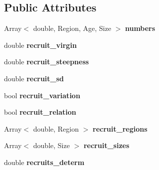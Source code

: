 \subsection*{Public Attributes}
\begin{DoxyCompactItemize}
\item 
\hypertarget{classIOSKJ_1_1Model_aa90edf75b7c9ebf8e50a30f3779b9664}{Array$<$ double, Region, Age, Size $>$ {\bfseries numbers}}\label{classIOSKJ_1_1Model_aa90edf75b7c9ebf8e50a30f3779b9664}

\item 
\hypertarget{classIOSKJ_1_1Model_a686cbcc0d80f740b223f1f25b0869da7}{double {\bfseries recruit\-\_\-virgin}}\label{classIOSKJ_1_1Model_a686cbcc0d80f740b223f1f25b0869da7}

\item 
\hypertarget{classIOSKJ_1_1Model_a862b4466389406b47613ad56ab137d8e}{double {\bfseries recruit\-\_\-steepness}}\label{classIOSKJ_1_1Model_a862b4466389406b47613ad56ab137d8e}

\item 
\hypertarget{classIOSKJ_1_1Model_a2efdcaae859b3c94a3a0c6cd885b4fc2}{double {\bfseries recruit\-\_\-sd}}\label{classIOSKJ_1_1Model_a2efdcaae859b3c94a3a0c6cd885b4fc2}

\item 
\hypertarget{classIOSKJ_1_1Model_a83f5db36b2616ea265b360872b5586e5}{bool {\bfseries recruit\-\_\-variation}}\label{classIOSKJ_1_1Model_a83f5db36b2616ea265b360872b5586e5}

\item 
\hypertarget{classIOSKJ_1_1Model_a758094db1a66fe7e6fb040e63169d50b}{bool {\bfseries recruit\-\_\-relation}}\label{classIOSKJ_1_1Model_a758094db1a66fe7e6fb040e63169d50b}

\item 
\hypertarget{classIOSKJ_1_1Model_a39e8570fc684498461ba6b9983bae0f1}{Array$<$ double, Region $>$ {\bfseries recruit\-\_\-regions}}\label{classIOSKJ_1_1Model_a39e8570fc684498461ba6b9983bae0f1}

\item 
\hypertarget{classIOSKJ_1_1Model_a73219276650abc075d7cfbf164083b67}{Array$<$ double, Size $>$ {\bfseries recruit\-\_\-sizes}}\label{classIOSKJ_1_1Model_a73219276650abc075d7cfbf164083b67}

\item 
\hypertarget{classIOSKJ_1_1Model_ad2450f5604c657cbe259b7b49e8f905a}{double {\bfseries recruits\-\_\-determ}}\label{classIOSKJ_1_1Model_ad2450f5604c657cbe259b7b49e8f905a}


\end{DoxyCompactItemize}
